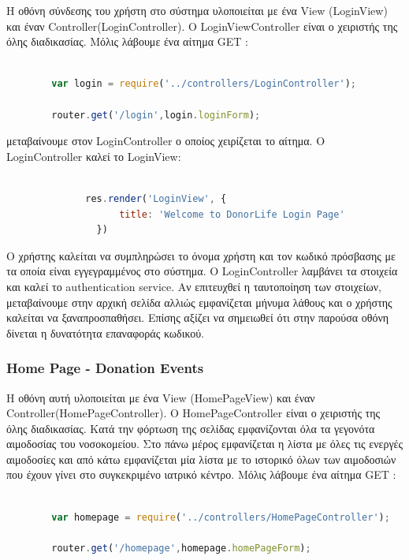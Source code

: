 	Η οθόνη σύνδεσης του χρήστη στο σύστημα υλοποιείται με ένα View (LoginView) και έναν Controller(LoginController).  O LoginViewController είναι ο χειριστής της όλης διαδικασίας. Μόλις λάβουμε ένα αίτημα GET :
		
		\begin{lstlisting}[language=Javascript]			
		
		var login = require('../controllers/LoginController');
		
		router.get('/login',login.loginForm);  


		\end{lstlisting}
		

μεταβαίνουμε στον LoginController ο οποίος χειρίζεται το αίτημα. Ο LoginController καλεί το LoginView:



		\begin{lstlisting}[language=Javascript]			
		
              res.render('LoginView', {
                    title: 'Welcome to DonorLife Login Page'
                })


		\end{lstlisting}

		Ο χρήστης καλείται να συμπληρώσει το όνομα χρήστη και τον κωδικό πρόσβασης με τα οποία είναι εγγεγραμμένος στο σύστημα. Ο LoginController λαμβάνει  τα στοιχεία και καλεί το authentication service. Αν επιτευχθεί  η  ταυτοποίηση των στοιχείων, μεταβαίνουμε στην αρχική σελίδα αλλιώς εμφανίζεται μήνυμα λάθους και ο χρήστης καλείται να ξαναπροσπαθήσει. Επίσης αξίζει να σημειωθεί ότι στην παρούσα οθόνη δίνεται η δυνατότητα επαναφοράς κωδικού.
		
		
				\subsubsection{Home Page - Donation Events}
		
	Η οθόνη αυτή υλοποιείται με ένα View (HomePageView) και έναν Controller(HomePageController).  O HomePageController είναι ο χειριστής της όλης διαδικασίας. Κατά την φόρτωση της σελίδας εμφανίζονται όλα τα γεγονότα αιμοδοσίας του νοσοκομείου. Στο πάνω μέρος εμφανίζεται η λίστα με όλες τις ενεργές αιμοδοσίες και από κάτω εμφανίζεται μία λίστα με το ιστορικό όλων των αιμοδοσιών που έχουν γίνει στο συγκεκριμένο ιατρικό κέντρο. Μόλις λάβουμε ένα αίτημα GET :
		
		\begin{lstlisting}[language=Javascript]			
		
		var homepage = require('../controllers/HomePageController');
		
		router.get('/homepage',homepage.homePageForm);  


		\end{lstlisting}
		
